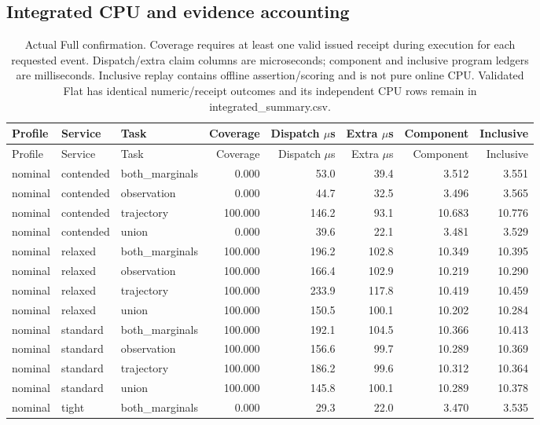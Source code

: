 \subsection{Integrated CPU and evidence accounting}
\small\begin{longtable}{@{}lllrrrrr@{}}
\caption{Actual Full confirmation. Coverage requires at least one valid issued receipt during execution for each requested event. Dispatch/extra claim columns are microseconds; component and inclusive program ledgers are milliseconds. Inclusive replay contains offline assertion/scoring and is not pure online CPU. Validated Flat has identical numeric/receipt outcomes and its independent CPU rows remain in integrated\_summary.csv.}\label{supp:integrated}\\\toprule
Profile & Service & Task & Coverage & Dispatch $\mu$s & Extra $\mu$s & Component & Inclusive\\\midrule\endfirsthead
\toprule
Profile & Service & Task & Coverage & Dispatch $\mu$s & Extra $\mu$s & Component & Inclusive\\\midrule\endhead
nominal & contended & both\_marginals & 0.000 & 53.0 & 39.4 & 3.512 & 3.551\\
nominal & contended & observation & 0.000 & 44.7 & 32.5 & 3.496 & 3.565\\
nominal & contended & trajectory & 100.000 & 146.2 & 93.1 & 10.683 & 10.776\\
nominal & contended & union & 0.000 & 39.6 & 22.1 & 3.481 & 3.529\\
nominal & relaxed & both\_marginals & 100.000 & 196.2 & 102.8 & 10.349 & 10.395\\
nominal & relaxed & observation & 100.000 & 166.4 & 102.9 & 10.219 & 10.290\\
nominal & relaxed & trajectory & 100.000 & 233.9 & 117.8 & 10.419 & 10.459\\
nominal & relaxed & union & 100.000 & 150.5 & 100.1 & 10.202 & 10.284\\
nominal & standard & both\_marginals & 100.000 & 192.1 & 104.5 & 10.366 & 10.413\\
nominal & standard & observation & 100.000 & 156.6 & 99.7 & 10.289 & 10.369\\
nominal & standard & trajectory & 100.000 & 186.2 & 99.6 & 10.312 & 10.364\\
nominal & standard & union & 100.000 & 145.8 & 100.1 & 10.289 & 10.378\\
nominal & tight & both\_marginals & 0.000 & 29.3 & 22.0 & 3.470 & 3.535\\

\end{longtable}
